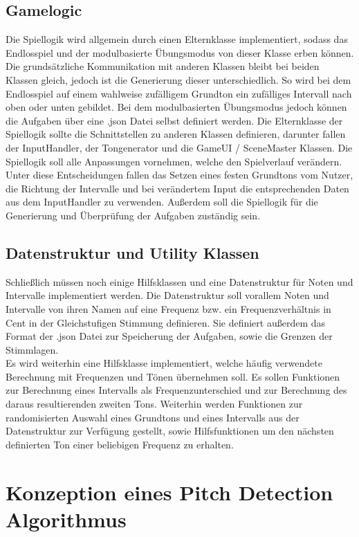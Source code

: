 \subsection{Gamelogic}
Die Spiellogik wird allgemein durch einen Elternklasse implementiert, sodass das Endlosspiel und der modulbasierte Übungsmodus von dieser Klasse erben können. Die grundsätzliche Kommunikation mit anderen Klassen bleibt bei beiden Klassen gleich, jedoch ist die Generierung dieser unterschiedlich. So wird bei dem Endlosspiel auf einem wahlweise zufälligem Grundton ein zufälliges Intervall nach oben oder unten gebildet. Bei dem modulbasierten Übungsmodus jedoch können die Aufgaben über eine .json Datei selbst definiert werden. Die Elternklasse der Spiellogik sollte die Schnittstellen zu anderen Klassen definieren, darunter fallen der InputHandler, der Tongenerator und die GameUI / SceneMaster Klassen. Die Spiellogik soll alle Anpassungen vornehmen, welche den Spielverlauf verändern. Unter diese Entscheidungen fallen das Setzen eines festen Grundtons vom Nutzer, die Richtung der Intervalle und bei verändertem Input die entsprechenden Daten aus dem InputHandler zu verwenden. Außerdem soll die Spiellogik für die Generierung und Überprüfung der Aufgaben zuständig sein.

\subsection{Datenstruktur und Utility Klassen}
Schließlich müssen noch einige Hilfsklassen und eine Datenstruktur für Noten und Intervalle implementiert werden. Die Datenstruktur soll vorallem Noten und Intervalle von ihren Namen auf eine Frequenz bzw. ein Frequenzverhältnis in Cent in der Gleichstufigen Stimmung definieren. Sie definiert außerdem das Format der .json Datei zur Speicherung der Aufgaben, sowie die Grenzen der Stimmlagen. \\ 
Es wird weiterhin eine Hilfsklasse implementiert, welche häufig verwendete Berechnung mit Frequenzen und Tönen übernehmen soll. Es sollen Funktionen zur Berechnung eines Intervalls als Frequenzunterschied und zur Berechnung des daraus resultierenden zweiten Tons. Weiterhin werden Funktionen zur randomisierten Auswahl eines Grundtons und eines Intervalls aus der Datenstruktur zur Verfügung gestellt, sowie Hilfsfunktionen um den nächsten definierten Ton einer beliebigen Frequenz zu erhalten.

\section{Konzeption eines Pitch Detection Algorithmus}

